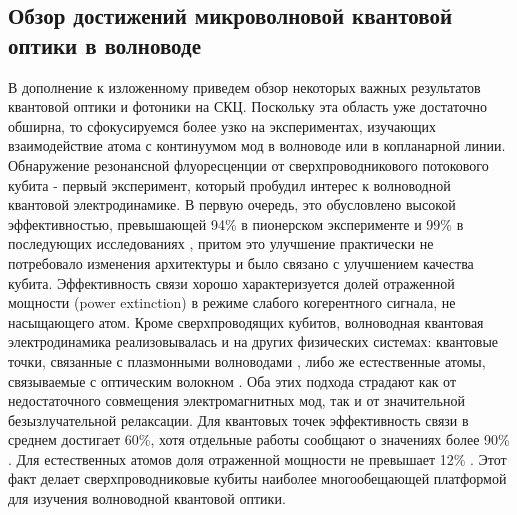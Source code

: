 \subsection{Обзор достижений микроволновой квантовой оптики в волноводе}
В дополнение к изложенному приведем обзор некоторых важных результатов квантовой оптики и фотоники на СКЦ. Поскольку эта область уже достаточно обширна, то сфокусируемся более узко на экспериментах, изучающих взаимодействие атома с континуумом мод в волноводе или в копланарной линии. Обнаружение резонансной флуоресценции от сверхпроводникового потокового кубита \cite{Astafiev2010resonance} - первый эксперимент, который пробудил интерес к волноводной квантовой электродинамике. В первую очередь, это обусловлено высокой эффективностью, превышающей 94\% в пионерском эксперименте и 99\% в последующих исследованиях \cite{single-photon-router,Delsing-giant-Kross-Kerr}, притом это улучшение практически не потребовало изменения архитектуры и было связано с улучшением качества кубита. Эффективность связи хорошо характеризуется долей отраженной мощности (power extinction) в режиме слабого когерентного сигнала, не насыщающего атом. Кроме сверхпроводящих кубитов, волноводная квантовая электродинамика реализовывалась и на других физических системах: квантовые точки, связанные с плазмонными волноводами \cite{akimov2007generation,martin2010resonance}, либо же естественные атомы, связываемые с оптическим волокном \cite{Vetsch2010,Goban2012fibertrap}. Оба этих подхода страдают как от недостаточного совмещения электромагнитных мод, так и от значительной безызлучательной релаксации. Для квантовых точек эффективность связи в среднем достигает 60\%, хотя отдельные работы сообщают о значениях более 90\% \cite{Arcari2014NearUnity}. Для естественных атомов доля отраженной мощности не превышает 12\% \cite{tey2008strong-int,Gerhard2007moleculeExt}. Этот факт делает сверхпроводниковые кубиты наиболее многообещающей платформой для изучения волноводной квантовой оптики.

